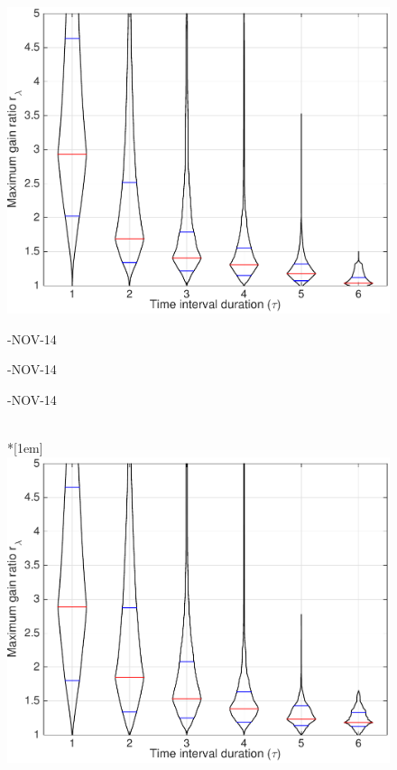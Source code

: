 \begin{figure}
\includegraphics[width=\mylength]{dist/20141108-maxGain-local-relativePerf} \\
\parbox{\mylength}{-NOV-14}
\parbox{\mylength}{-NOV-14}
\parbox{\mylength}{-NOV-14} \\*[1em]
\includegraphics[width=\mylength]{dist/20141110-maxGain-local-relativePerf}

\end{figure}
